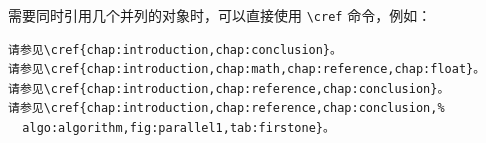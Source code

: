 需要同时引用几个并列的对象时，可以直接使用 \verb|\cref| 命令，例如：
\begin{Verbatim}
请参见\cref{chap:introduction,chap:conclusion}。
请参见\cref{chap:introduction,chap:math,chap:reference,chap:float}。
请参见\cref{chap:introduction,chap:reference,chap:conclusion}。
请参见\cref{chap:introduction,chap:reference,chap:conclusion,%
  algo:algorithm,fig:parallel1,tab:firstone}。
\end{Verbatim}

